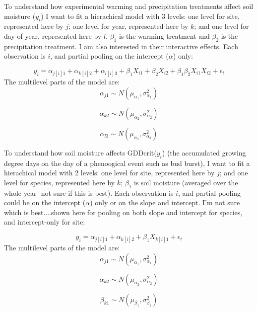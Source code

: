 \documentclass[12pt,a4paper]{article}
\begin{document}
\noindent To understand how experimental warming and precipitation treatments affect soil moisture ($y_{i}$) I want to fit a hierachical model with 3 levels: one level for site, represented here by $j$; one level for year, represented here by $k$; and one level for day of year, represented here by $l$. $\beta_{1}$ is the warming treatment and $\beta_{2}$ is the precipitation treatment.  I am also interested in their interactive effects. Each observation is $i$, and partial pooling on the intercept ($\alpha$) only:


\begin{equation}
y_{i}=\alpha_{j[i]1}+\alpha_{k[i]2}+\alpha_{l[i]3}+\beta_{1}X_{i1}+\beta_{2}X_{i2}+\beta_{1}\beta_{2}X_{i1}X_{i2}+\epsilon_{i}
\end{equation}
The multilevel parts of the model are:
\begin{equation}
\alpha_{j1} \sim N(\mu_{\alpha_1}, \sigma^{2}_{\alpha_1})
\end{equation}

\begin{equation}
\alpha_{k2} \sim N(\mu_{\alpha_2}, \sigma^{2}_{\alpha_2})
\end{equation}

\begin{equation}
\alpha_{l3} \sim N(\mu_{\alpha_3}, \sigma^{2}_{\alpha_3})
\end{equation}



\noindent To understand how soil moisture  affects GDDcrit($y_{i}$) (the accumulated growing degree days on the day of a phenoogical event such as bud burst), I want to fit a hierachical model with 2 levels: one level for site, represented here by $j$; and one level for species, represented here by $k$;  $\beta_{1}$ is soil moisture (averaged over the whole year- not sure if this is best).  Each observation is $i$, and partial pooling could be on the intercept ($\alpha$) only or on the slope and intercept. I'm not sure which is best....shown here for pooling on both slope and intercept for species, and intercept-only for site:


\begin{equation}
y_{i}=\alpha_{j[i]1}+\alpha_{k[i]2}+\beta_{1}X_{k[i]1}+\epsilon_{i}
\end{equation}
The multilevel parts of the model are:
\begin{equation}
\alpha_{j1} \sim N(\mu_{\alpha_1}, \sigma^{2}_{\alpha_1})
\end{equation}

\begin{equation}
\alpha_{k2} \sim N(\mu_{\alpha_2}, \sigma^{2}_{\alpha_2})
\end{equation}

\begin{equation}
\beta_{k1} \sim N(\mu_{\beta_1}, \sigma^{2}_{\beta_1})
\end{equation}
\end{document}
